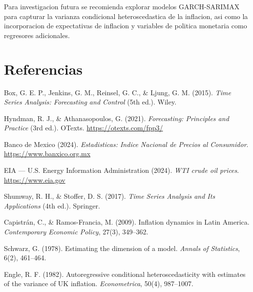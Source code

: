 \documentclass[12pt,a4paper]{article}
\begin{document}
Para investigacion futura se recomienda explorar modelos GARCH-SARIMAX para capturar la varianza condicional heteroscedastica de la inflacion, asi como la incorporacion de expectativas de inflacion y variables de politica monetaria como regresores adicionales.

\newpage
\section*{Referencias}

\begin{enumerate}[label={[\arabic*]}]
  \item Box, G. E. P., Jenkins, G. M., Reinsel, G. C., \& Ljung, G. M. (2015). \textit{Time Series Analysis: Forecasting and Control} (5th ed.). Wiley.
  \item Hyndman, R. J., \& Athanasopoulos, G. (2021). \textit{Forecasting: Principles and Practice} (3rd ed.). OTexts. \url{https://otexts.com/fpp3/}
  \item Banco de Mexico (2024). \textit{Estadisticas: Indice Nacional de Precios al Consumidor}. \url{https://www.banxico.org.mx}
  \item EIA --- U.S. Energy Information Administration (2024). \textit{WTI crude oil prices}. \url{https://www.eia.gov}
  \item Shumway, R. H., \& Stoffer, D. S. (2017). \textit{Time Series Analysis and Its Applications} (4th ed.). Springer.
  \item Capistrán, C., \& Ramos-Francia, M. (2009). Inflation dynamics in Latin America. \textit{Contemporary Economic Policy}, 27(3), 349--362.
  \item Schwarz, G. (1978). Estimating the dimension of a model. \textit{Annals of Statistics}, 6(2), 461--464.
  \item Engle, R. F. (1982). Autoregressive conditional heteroscedasticity with estimates of the variance of UK inflation. \textit{Econometrica}, 50(4), 987--1007.
\end{enumerate}
\end{document}
